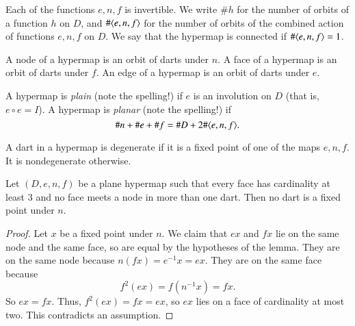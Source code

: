 Each of the functions $e,n,f$ is invertible.  We write $\#h$ for the
number of orbits of a function $h$ on $D$, and $\#\langle e,n,f\rangle$
for the number of orbits of the combined action of functions $e,n,f$
on $D$.  We say that the hypermap is connected if $\#\langle e,n,f\rangle
= 1$.

\begin{definition}  A node of a hypermap is an orbit of darts under
$n$.  A face of a hypermap is an  orbit of darts under $f$.  An edge
of a hypermap is an orbit of darts under $e$.
\end{definition}

\begin{definition} A hypermap is {\it plain} (note the spelling!) if
$e$ is an involution on $D$ (that is, $e\circ e = I$).  A hypermap
is {\it planar} (note the spelling!) if
    $$\# n + \# e + \# f = \# D + 2 \#\langle e,n,f\rangle.$$
\end{definition}

\begin{definition} A dart in a hypermap is degenerate if it is a
fixed point of one of the maps $e,n,f$.  It is nondegenerate
otherwise.
\end{definition}


\begin{lemma}\label{lemma:nondegen} 
Let $(D,e,n,f)$ be a plane hypermap such that every face has
cardinality at least $3$ and no face meets a node in more than one
dart.  Then no dart is a fixed point under $n$.
\end{lemma}

\begin{proof}  Let $x$ be a fixed point under
$n$. We claim that $e x$ and $f x$ lie on the same node and the same
face, so are equal by the hypotheses of the lemma.  
They are on the same node because
$n(f x) = e^{-1} x = e x$. They are on the same face because
    $$f^2 (e x) =  f(n^{-1} x) = f x.$$
So $e x = f x$.   Thus, $f^2 (e x) = f x = e x$, so $e x$ lies on a
face of cardinality at most two.  This contradicts an assumption.
\end{proof}


